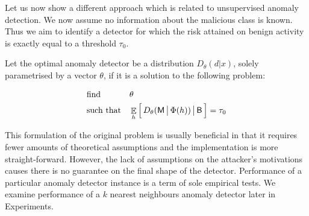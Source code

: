 Let us now show a different approach which is related to unsupervised anomaly detection. We now assume no information about the malicious class is known. Thus we aim to identify a detector for which the risk attained on benign activity is exactly equal to a threshold $\tau_0$.

\begin{definition}\label{def:anomaly_detection}
    Let the optimal anomaly detector be a distribution $D_\theta(d | x)$, solely parametrised by a vector $\theta$, if it is a solution to the following problem:

    \begin{equation*}
        \begin{aligned}
        & \text{find}
        & & \theta \\
        & \text{such that}
        & & \mathop{\mathbb{E}}_h \Big[\, D_\theta(\mathsf{M} \,\big|\, \Phi(h)) \,\big|\, \mathsf{B} \,\Big] = \tau_0 \\
        \end{aligned}
    \end{equation*}
\end{definition}

This formulation of the original problem is usually beneficial in that it requires fewer amounts of theoretical assumptions and the implementation is more straight-forward. However, the lack of assumptions on the attacker's motivations causes there is no guarantee on the final shape of the detector. Performance of a particular anomaly detector instance is a term of sole empirical tests. We examine performance of a $k$ nearest neighbours anomaly detector later in Experiments.
